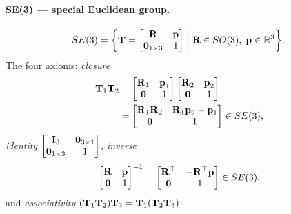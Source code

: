 \paragraph{SE(3) --- special Euclidean group.}
\begin{align}
SE(3) = \left\{\vect{T} = \begin{bmatrix} \vect{R} & \vect{p} \\ \vect{0}_{1\times3} & 1 \end{bmatrix} \;\middle|\; \vect{R}\in SO(3),\;\vect{p}\in\Reals^{3}\right\}.
\end{align}
The four axioms: \emph{closure}
\begin{align}
\vect{T}_1\vect{T}_2 &= \begin{bmatrix}\vect{R}_1 & \vect{p}_1\\\vect{0} & 1\end{bmatrix}\begin{bmatrix}\vect{R}_2 & \vect{p}_2\\\vect{0} & 1\end{bmatrix} \\
&= \begin{bmatrix}\vect{R}_1\vect{R}_2 & \vect{R}_1\vect{p}_2+\vect{p}_1\\\vect{0} & 1\end{bmatrix} \in SE(3),
\end{align}
\emph{identity} $\begin{bmatrix}\vect{I}_3 & \vect{0}_{3\times1}\\\vect{0}_{1\times3} & 1\end{bmatrix}$, \emph{inverse}
\begin{align}
\begin{bmatrix} \vect{R} & \vect{p} \\ \vect{0} & 1 \end{bmatrix}^{-1} = \begin{bmatrix} \vect{R}\trans & -\vect{R}\trans\vect{p} \\ \vect{0} & 1 \end{bmatrix} \in SE(3),
\end{align}
and \emph{associativity} $(\vect{T}_1\vect{T}_2)\vect{T}_3 = \vect{T}_1(\vect{T}_2\vect{T}_3)$.


